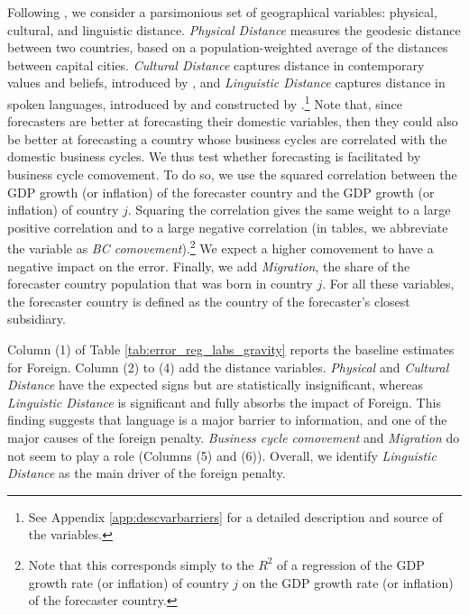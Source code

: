 Following \citet{Pellegrino2021}, we consider a parsimonious set of geographical variables: physical, cultural, and linguistic distance. \textit{Physical Distance} measures the geodesic distance between two countries, based on a population-weighted average of the distances between capital cities. \textit{Cultural Distance} captures distance in contemporary values and beliefs, introduced by \citet{Spolaore2016}, and \textit{Linguistic Distance} captures distance in spoken languages, introduced by \citet{Fearon2003} and constructed by \citet{Spolaore2016}.\footnote{See Appendix \ref{app:descvarbarriers} for a detailed description and source of the variables.} Note that, since forecasters are better at forecasting their domestic variables, then they could also be better at forecasting a country whose business cycles are correlated with the domestic business cycles. We thus test whether forecasting is facilitated by business cycle comovement. To do so, we use the squared correlation between the GDP growth (or inflation) of the forecaster country and the GDP growth (or inflation) of country $j$. Squaring the correlation gives the same weight to a large positive correlation and to a large negative correlation (in tables, we abbreviate the variable as \textit{BC comovement}).\footnote{Note that this corresponds simply to the $R^2$ of a regression of the GDP growth rate (or inflation) of country $j$ on the GDP growth rate (or inflation) of the forecaster country.} We expect a higher comovement to have a negative impact on the error. Finally, we add \textit{Migration}, the share of the forecaster country population that was born in country $j$. For all these variables, the forecaster country is defined as the country of the forecaster's closest subsidiary.

%		

\begin{sidewaystable}
	\centering
	{
		
	}
\end{sidewaystable}

Column (1) of Table \ref{tab:error_reg_labs_gravity} reports the baseline estimates for Foreign. Column (2) to (4) add the distance variables. \textit{Physical} and \textit{Cultural Distance} have the expected signs but are statistically insignificant, whereas \textit{Linguistic Distance} is significant and fully absorbs the impact of Foreign. This finding suggests that language is a major barrier to information, and one of the major causes of the foreign penalty. \textit{Business cycle comovement} and \textit{Migration} do not seem to play a role (Columns (5) and (6)). Overall, we identify \textit{Linguistic Distance} as the main driver of the foreign penalty.


